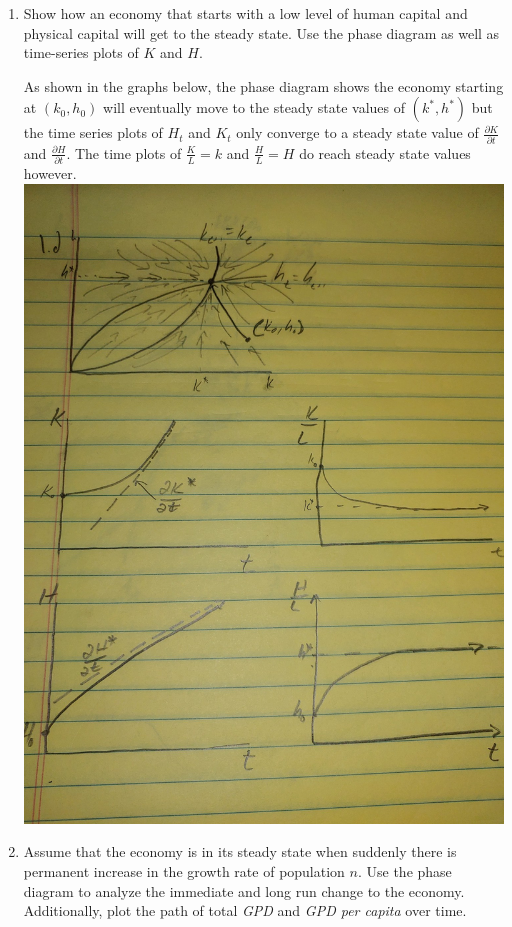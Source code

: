 \documentclass[11pt]{SelfArxOneColBMN}
\begin{document}
\begin{enumerate}
\begin{enumerate}
\begin{solution}
    \end{solution}
    \item Show how an economy that starts with a low level of human capital and physical capital will get to the steady state. Use the phase diagram as well as time-series plots of $K$ and $H$.
    \begin{solution}
      As shown in the graphs below, the phase diagram shows the economy starting at $(k_0,h_0)$ will eventually move to the steady state values of $(k^*,h^*)$ but the time series plots of $H_t$ and $K_t$ only converge to a steady state value of $\frac{\partial K}{\partial t}$ and $\frac{\partial H}{\partial t}$. The time plots of $\frac{K}{L} = k$ and $\frac{H}{L} = H$ do reach steady state values however.\\
      \includegraphics[scale=.2]{graph1d.JPG}\\
      \centering
    \end{solution}
    \item Assume that the economy is in its steady state when suddenly there is permanent increase in the growth rate of population $n$. Use the phase diagram to analyze the immediate and long run change to the economy. Additionally, plot the path of total \textit{GPD} and \textit{GPD per capita} over time.

\end{enumerate}
\end{enumerate}
\end{document}
